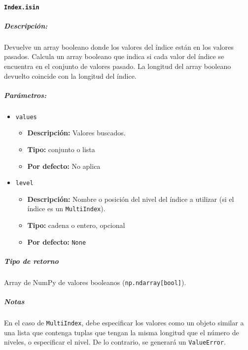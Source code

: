 \paragraph{\texttt{Index.isin}}
\subparagraph{Descripción:}
Devuelve un array booleano donde los valores del índice están en los valores pasados. Calcula un array booleano que indica si cada valor del índice se encuentra en el conjunto de valores pasado. La longitud del array booleano devuelto coincide con la longitud del índice.
\subparagraph{Parámetros:}
\begin{itemize}
\item \texttt{values}
\begin{itemize}
\item \textbf{Descripción:} Valores buscados.
\item \textbf{Tipo:} conjunto o lista
\item \textbf{Por defecto:} No aplica
\end{itemize}
\item \texttt{level}
\begin{itemize}
\item \textbf{Descripción:} Nombre o posición del nivel del índice a utilizar (si el índice es un \texttt{MultiIndex}).
\item \textbf{Tipo:} cadena o entero, opcional
\item \textbf{Por defecto:} \texttt{None}
\end{itemize}
\end{itemize}
\subparagraph{Tipo de retorno}
Array de NumPy de valores booleanos (\texttt{np.ndarray[bool]}).
\subparagraph{Notas}
En el caso de \texttt{MultiIndex}, debe especificar los valores como un objeto similar a una lista que contenga tuplas que tengan la misma longitud que el número de niveles, o especificar el nivel. De lo contrario, se generará un \texttt{ValueError}.
